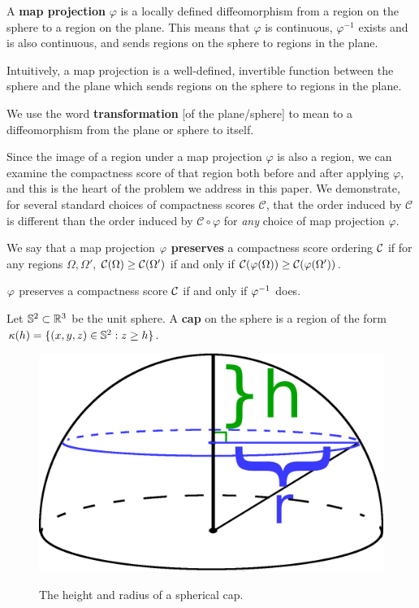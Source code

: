 \begin{definition}
  A \textbf{map projection} $\varphi$ is a locally defined 
  diffeomorphism from a region on the sphere to a region on the 
  plane. This means that $\varphi$ is continuous,
  $\varphi^{-1}$ exists and is also continuous, and sends regions on the sphere to regions in the plane.
\end{definition}

Intuitively, a map projection is a well-defined, invertible function between the sphere and the plane which sends regions on the sphere to regions in the plane.

\begin{definition}
  We use the word \textbf{transformation} [of the plane/sphere] to mean
  to a diffeomorphism from the plane or sphere to itself.
\end{definition}

Since the image of a region under a map projection $\varphi$ is also
a region, we can examine the compactness score of that region both 
before and after applying $\varphi$, and this is the heart of the
problem we address in this paper.  We demonstrate, for several
standard choices of compactness scores $\mathcal{C}$, that the order
induced by $\mathcal{C}$ is different than the order induced by
$\mathcal{C}\circ\varphi$ for \textit{any} choice of map projection
$\varphi$.

\begin{definition}
  We say that a map projection $\varphi$ \textbf{preserves} a 
  compactness score ordering $\mathcal{C}$ if for any regions 
  $\Omega,\Omega'$, $\mathcal{C}(\Omega)\ge \mathcal{C}(\Omega')$ 
  if and only if $\mathcal{C}(\varphi(\Omega)) \ge \mathcal{C}(\varphi(\Omega'))$.
\end{definition}
\begin{remark}
  $\varphi$ preserves a compactness score $\mathcal{C}$ 
  if and only if $\varphi^{-1}$ does.
\end{remark}
\begin{definition}
  Let $\mathbb{S}^2\subset \mathbb{R}^3$ be the unit sphere. A 
  \textbf{cap} on the sphere is a region of the 
  form $\kappa(h) = \{(x,y,z)\in \mathbb{S}^2: z\ge h\}$.
\end{definition}

\begin{figure}
  \centering
  \includegraphics[width=.3\textwidth]{figs/spherecapschema}\\[1.5em]
  \caption{ The height and radius of a spherical cap. }
  \label{fig:caphr}
\end{figure}
